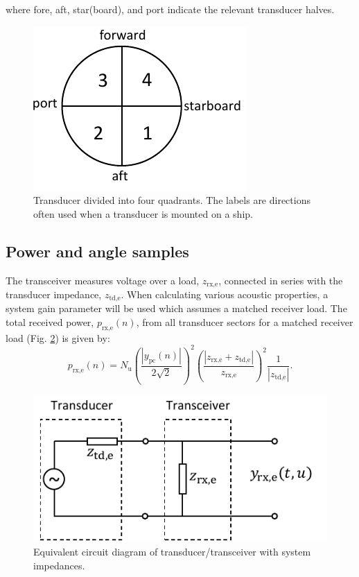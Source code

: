 \documentclass[preprint,12pt,TurnOnLineNumbers]{JASAnew}
\newcommand{\samplesymt}{n}
\newcommand{\nchannels}{N_{\textrm{u}}}
\newcommand{\zrxe}{z_{\textrm{rx,e}}}
\newcommand{\ztde}{z_{\textrm{td,e}}}
\newcommand{\prxe}{p_{\textrm{rx,e}}}
\newcommand{\ypc}{y_{\textrm{pc}}}
\begin{document}
%
where fore, aft, star(board), and port indicate the relevant transducer halves.
\begin{figure}
\includegraphics{Fig_trd_quad}
\caption{\label{fi:trd_quad}Transducer divided into four quadrants. The labels are directions often used when a transducer is mounted on a ship.}
\end{figure}
%


\subsection{Power and angle samples}
The transceiver measures voltage over a load, $\zrxe$, connected in series with the transducer impedance, $\ztde$. When calculating various acoustic properties, a system gain parameter will be used which assumes a matched receiver load. The total received power, $\prxe(\samplesymt)$, from all transducer sectors for a matched receiver load (Fig. \ref{fi:impedances}) is given by: 
\begin{equation}
\label{eq:prx}
\prxe(\samplesymt) = \nchannels\left( \frac{|\ypc(\samplesymt)|}{2\sqrt{2}} \right)^2 \left( \frac{|\zrxe+\ztde|}{\zrxe} \right)^2 \frac{1}{|\ztde|}.
\end{equation}
%
\begin{figure}
\includegraphics[width=16cm]{Fig_impedances}
\caption{\label{fi:impedances}Equivalent circuit diagram of transducer/transceiver with system impedances.}
\end{figure}
\end{document}

